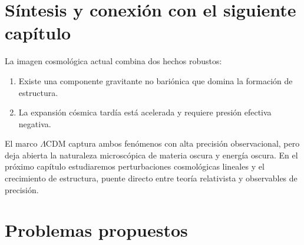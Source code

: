 \section{Síntesis y conexión con el siguiente capítulo}
\label{sec:sintesis_cap13}

La imagen cosmológica actual combina dos hechos robustos:
\begin{enumerate}[leftmargin=2em, label=\textbf{\arabic*.}]
  \item Existe una componente gravitante no bariónica que domina la formación de estructura.
  \item La expansión cósmica tardía está acelerada y requiere presión efectiva negativa.
\end{enumerate}

El marco $\Lambda$CDM captura ambos fenómenos con alta precisión observacional, pero deja abierta la naturaleza microscópica de materia oscura y energía oscura. En el próximo capítulo estudiaremos perturbaciones cosmológicas lineales y el crecimiento de estructura, puente directo entre teoría relativista y observables de precisión.

\section*{Problemas propuestos}

